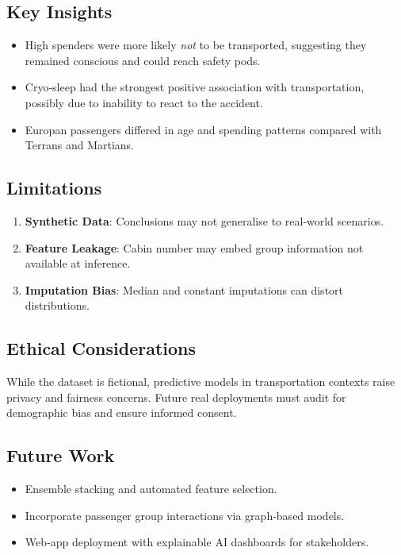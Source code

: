 \documentclass[12pt]{article}
\begin{document}
\subsection{Key Insights}
\begin{itemize}
  \item High spenders were more likely \emph{not} to be transported, suggesting they remained conscious and could reach safety pods.
  \item Cryo‑sleep had the strongest positive association with transportation, possibly due to inability to react to the accident.
  \item Europan passengers differed in age and spending patterns compared with Terrans and Martians.
\end{itemize}
\subsection{Limitations}
\begin{enumerate}
  \item \textbf{Synthetic Data}: Conclusions may not generalise to real‑world scenarios.
  \item \textbf{Feature Leakage}: Cabin number may embed group information not available at inference.
  \item \textbf{Imputation Bias}: Median and constant imputations can distort distributions.
\end{enumerate}
\subsection{Ethical Considerations}
While the dataset is fictional, predictive models in transportation contexts raise privacy and fairness concerns.  Future real deployments must audit for demographic bias and ensure informed consent.
\subsection{Future Work}
\begin{itemize}
  \item Ensemble stacking and automated feature selection.
  \item Incorporate passenger group interactions via graph‑based models.
  \item Web‑app deployment with explainable AI dashboards for stakeholders.
\end{itemize}

\end{document}
